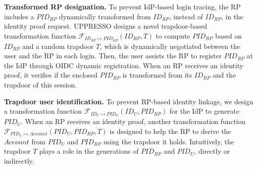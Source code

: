 \noindent \textbf{Transformed RP designation.} To prevent IdP-based login tracing, the RP includes a $PID_{RP}$ dynamically transformed from $ID_{RP}$, instead of $ID_{RP}$, in the identity proof request. UPPRESSO designs a novel trapdoor-based transformation function $\mathcal{F}_{ID_{RP} \mapsto PID_{RP}}(ID_{RP}, T)$ to compute $PID_{RP}$ based on $ID_{RP}$ and a random trapdoor $T$, which is dynamically negotiated between the user and the RP in each login. Then, the user assists the RP to register $PID_{RP}$ at the IdP through OIDC dynamic registration. When an RP receives an identity proof, it verifies if the enclosed $PID_{RP}$ is transformed from its $ID_{RP}$ and the trapdoor of this session.



\noindent \textbf{Trapdoor user identification.} To prevent RP-based identity linkage, we design a transformation function $\mathcal{F}_{ID_{U} \mapsto PID_U}(ID_U, PID_{RP})$ for the IdP to generate $PID_U$. When an RP receives an identity proof, another transformation function $\mathcal{F}_{PID_{U} \mapsto Account}(PID_U, PID_{RP}, T)$ is designed to help the RP to derive the $Account$ from $PID_U$ and $PID_{RP}$ using the trapdoor it holds. Intuitively, the trapdoor $T$ plays a role in the generations of $PID_{RP}$ and $PID_U$, directly or indirectly.


